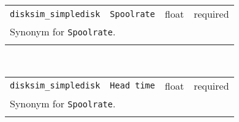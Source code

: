 \noindent 
\begin{tabular}{|p{\lpmodwidth}|p{\lpnamewidth}|p{0.5in}|p{0.5in}|}
\cline{1-4}
\texttt{disksim\_simpledisk} & \texttt{Spoolrate} & float & required \\ 
\cline{1-4}
\multicolumn{4}{|p{6in}|}{
Synonym for \texttt{Spoolrate}.
}\\ 
\cline{1-4}
\multicolumn{4}{p{5in}}{}\\
\end{tabular}\\ 
\noindent 
\begin{tabular}{|p{\lpmodwidth}|p{\lpnamewidth}|p{0.5in}|p{0.5in}|}
\cline{1-4}
\texttt{disksim\_simpledisk} & \texttt{Head time} & float & required \\ 
\cline{1-4}
\multicolumn{4}{|p{6in}|}{
Synonym for \texttt{Spoolrate}.
}\\ 
\cline{1-4}
\multicolumn{4}{p{5in}}{}\\
\end{tabular}\\ 
